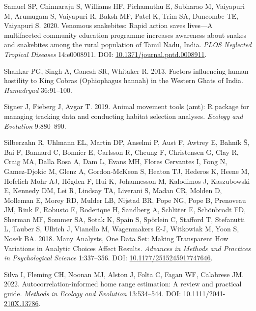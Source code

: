 \documentclass[10pt,a4paper]{article}
\newlength{\cslhangindent}
\newenvironment{CSLReferences}[2] %
 {\begin{list}{}{%
  \setlength{\itemindent}{0pt}
  \setlength{\leftmargin}{0pt}
  \setlength{\parsep}{0pt}
  \ifodd #1
   \setlength{\leftmargin}{\cslhangindent}
   \setlength{\itemindent}{-1\cslhangindent}
  \fi
  \setlength{\itemsep}{#2\baselineskip}}}
 {\end{list}}
\begin{document}
\begin{CSLReferences}{1}{0}
Samuel SP, Chinnaraju S, Williams HF, Pichamuthu E, Subharao M, Vaiyapuri M, Arumugam S, Vaiyapuri R, Baksh MF, Patel K, Trim SA, Duncombe TE, Vaiyapuri S. 2020. Venomous snakebites: {Rapid} action saves lives---{A} multifaceted community education programme increases awareness about snakes and snakebites among the rural population of {Tamil} {Nadu}, {India}. \emph{PLOS Neglected Tropical Diseases} 14:e0008911. DOI: \href{https://doi.org/10.1371/journal.pntd.0008911}{10.1371/journal.pntd.0008911}.

Shankar PG, Singh A, Ganesh SR, Whitaker R. 2013. Factors influencing human hostility to {King} {Cobras} ({Ophiophagus} hannah) in the {Western} {Ghats} of {India}. \emph{Hamadryad} 36:91--100.

Signer J, Fieberg J, Avgar T. 2019. Animal movement tools (amt): R package for managing tracking data and conducting habitat selection analyses. \emph{Ecology and Evolution} 9:880--890.

Silberzahn R, Uhlmann EL, Martin DP, Anselmi P, Aust F, Awtrey E, Bahník Š, Bai F, Bannard C, Bonnier E, Carlsson R, Cheung F, Christensen G, Clay R, Craig MA, Dalla Rosa A, Dam L, Evans MH, Flores Cervantes I, Fong N, Gamez-Djokic M, Glenz A, Gordon-McKeon S, Heaton TJ, Hederos K, Heene M, Hofelich Mohr AJ, Högden F, Hui K, Johannesson M, Kalodimos J, Kaszubowski E, Kennedy DM, Lei R, Lindsay TA, Liverani S, Madan CR, Molden D, Molleman E, Morey RD, Mulder LB, Nijstad BR, Pope NG, Pope B, Prenoveau JM, Rink F, Robusto E, Roderique H, Sandberg A, Schlüter E, Schönbrodt FD, Sherman MF, Sommer SA, Sotak K, Spain S, Spörlein C, Stafford T, Stefanutti L, Tauber S, Ullrich J, Vianello M, Wagenmakers E-J, Witkowiak M, Yoon S, Nosek BA. 2018. Many {Analysts}, {One} {Data} {Set}: {Making} {Transparent} {How} {Variations} in {Analytic} {Choices} {Affect} {Results}. \emph{Advances in Methods and Practices in Psychological Science} 1:337--356. DOI: \href{https://doi.org/10.1177/2515245917747646}{10.1177/2515245917747646}.

Silva I, Fleming CH, Noonan MJ, Alston J, Folta C, Fagan WF, Calabrese JM. 2022. Autocorrelation‐informed home range estimation: {A} review and practical guide. \emph{Methods in Ecology and Evolution} 13:534--544. DOI: \href{https://doi.org/10.1111/2041-210X.13786}{10.1111/2041-210X.13786}.


\end{CSLReferences}
\end{document}
